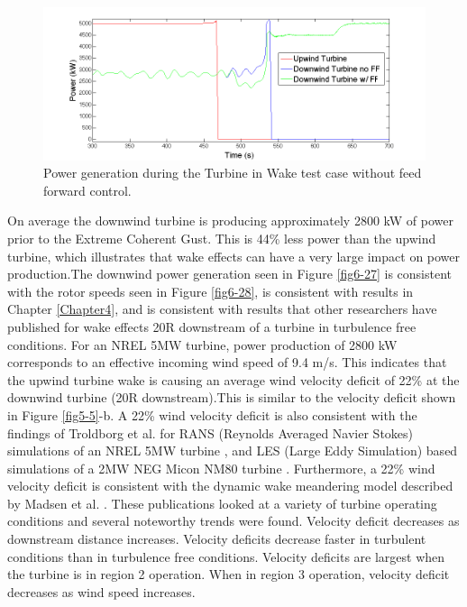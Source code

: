 \begin{figure}[!htbp] 
	\centering
		\includegraphics[width = \linewidth]{Figures/ch6Figures/fig6-29.png}

	\caption{Power generation during the Turbine in Wake test case without feed forward control.}
	\label{fig6-29}
\end{figure}

On average the downwind turbine is producing approximately 2800 kW of power prior to the Extreme Coherent Gust. This is 44\% less power than the upwind turbine, which illustrates that wake effects can have a very large impact on power production.The downwind power generation seen in Figure \ref{fig6-27} is consistent with the rotor speeds seen in Figure \ref{fig6-28}, is consistent with results in Chapter \ref{Chapter4}, and is consistent with results that other researchers have published for wake effects 20R downstream of a turbine in turbulence free conditions. For an NREL 5MW turbine, power production of 2800 kW corresponds to an effective incoming wind speed of 9.4 m/s. This indicates that the upwind turbine wake is causing an average wind velocity deficit of 22\%  at the downwind turbine (20R downstream).This is similar to the velocity deficit shown in Figure \ref{fig5-5}-b. A 22\% wind velocity deficit is also consistent with the findings of Troldborg et al. for RANS (Reynolds Averaged Navier Stokes) simulations of an NREL 5MW turbine \cite{troldborg2015}, and LES (Large Eddy Simulation) based simulations of a 2MW NEG Micon NM80 turbine \cite{troldborg2010,troldborg2010b}. Furthermore, a 22\% wind velocity deficit is consistent with the dynamic wake meandering model described by Madsen et al. \cite{madsen2010}. These publications looked at a variety of turbine operating conditions and several noteworthy trends were found. Velocity deficit decreases as downstream distance increases. Velocity deficits decrease faster in turbulent conditions than in turbulence free conditions. Velocity deficits are largest when the turbine is in region 2 operation. When in region 3 operation, velocity deficit decreases as wind speed increases.


